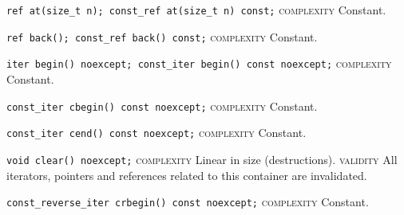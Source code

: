 \noindent{}\hspace*{0.25em}\lstinline[basicstyle=\ttfamily\color{cgreen}]{ref at(size_t n); const_ref at(size_t n) const;} \textsc{complexity} Constant.\\\vspace{-0.6em}

\noindent{}\hspace*{0.25em}\lstinline[basicstyle=\ttfamily\color{cgreen}]{ref back(); const_ref back() const;} \textsc{complexity} Constant.\\\vspace{-0.6em}

\noindent{}\hspace*{0.25em}\lstinline[basicstyle=\ttfamily\color{cgreen}]{iter begin() noexcept; const_iter begin() const noexcept;} \textsc{complexity} Constant.\\\vspace{-0.6em}

\noindent{}\hspace*{0.25em}\lstinline[basicstyle=\ttfamily\color{cgreen}]{const_iter cbegin() const noexcept;} \textsc{complexity} Constant.\\\vspace{-0.6em}

\noindent{}\hspace*{0.25em}\lstinline[basicstyle=\ttfamily\color{cgreen}]{const_iter cend() const noexcept;} \textsc{complexity} Constant.\\\vspace{-0.6em}

\noindent{}\hspace*{0.25em}\lstinline[basicstyle=\ttfamily\color{corange}]{void clear() noexcept;} \textsc{complexity} Linear in size (destructions). \textsc{validity} All iterators, pointers and references related to this container are invalidated.\\\vspace{-0.6em}

\noindent{}\hspace*{0.25em}\lstinline[basicstyle=\ttfamily\color{cgreen}]{const_reverse_iter crbegin() const noexcept;} \textsc{complexity} Constant.\\\vspace{-0.6em}

